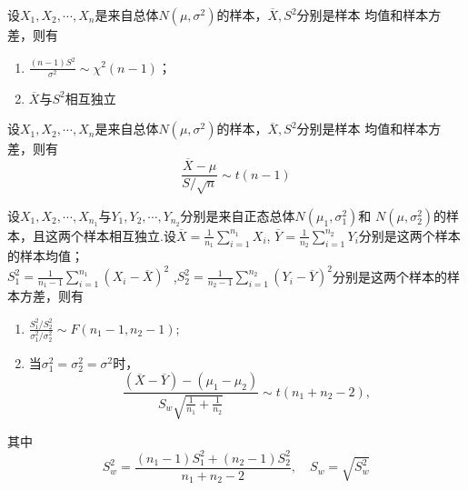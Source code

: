 \begin{theorem}
    设$X_1,X_2,\cdots,X_n$是来自总体$N(\mu,\sigma^2)$的样本，$\overline{X},S^2$分别是样本
    均值和样本方差，则有
    \begin{enumerate}[1$^{\circ}$]
        \item $\displaystyle{\frac{(n-1)S^2}{\sigma^2}\sim \chi^2(n-1)}$；
        \item $\overline{X}$与$S^2$相互独立
    \end{enumerate} 
\end{theorem}

\begin{theorem}
    设$X_1,X_2,\cdots,X_n$是来自总体$N(\mu,\sigma^2)$的样本，$\overline{X},S^2$分别是样本
    均值和样本方差，则有
    $$\frac{\overline{X}-\mu}{S/\sqrt{n}}\sim t(n-1)$$
\end{theorem}

\begin{theorem}
    设$X_1,X_2,\cdots,X_{n_1}$与$Y_1,Y_2,\cdots,Y_{n_2}$分别是来自正态总体$N(\mu_1,\sigma_1^2)$和
    $N(\mu,\sigma_2^2)$的样本，且这两个样本相互独立.设$\displaystyle{\overline{X}=\frac{1}{n_1}\sum_{i=1}^{n_1}X_i}$,
    $\displaystyle{\overline{Y}=\frac{1}{n_2}\sum_{i=1}^{n_2}Y_i}$分别是这两个样本的样本均值；\\
    $\displaystyle{S_1^2=\frac{1}{n_1-1}\sum_{i=1}^{n_1}{(X_i-\overline{X})}^2}$
    ,$\displaystyle{S^2_2=\frac{1}{n_2-1}\sum_{i=1}^{n_2}{(Y_i-\overline{Y})}^2}$分别是这两个样本的样本方差，则有
    \begin{enumerate}[1$^{\circ}$]
        \item $\displaystyle{\frac{S_1^2/S_2^2}{\sigma_1^2/\sigma_2^2}\sim F(n_1-1,n_2-1)}$;
        \item 当$\sigma_1^2=\sigma_2^2=\sigma^2$时，
        $$\frac{(\overline{X}-\overline{Y})-(\mu_1-\mu_2)}{S_w\sqrt{\frac{1}{n_1}+\frac{1}{n_2}}}\sim t(n_1+n_2-2),$$
    \end{enumerate}
    其中
    $$S_w^2=\frac{(n_1-1)S_1^2+(n_2-1)S_2^2}{n_1+n_2-2},\quad S_w=\sqrt{S_w^2}$$
\end{theorem}